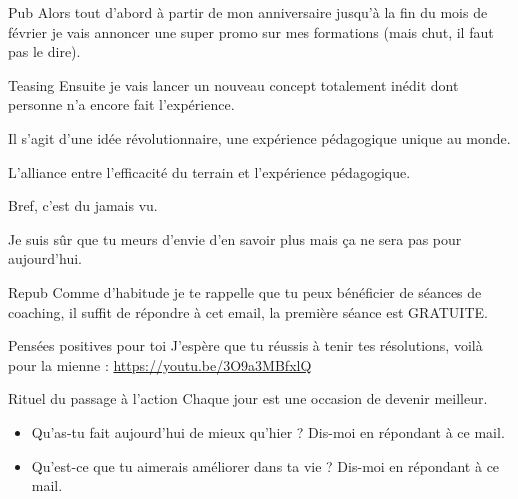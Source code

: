 \documentclass[presentation]{beamer}
\begin{document}
\begin{frame}[label={sec:orgd93b9af}]{Pub}
Alors tout d'abord à partir de mon anniversaire jusqu'à la fin du mois
de février je vais annoncer une super promo sur mes formations (mais
chut, il faut pas le dire).
\end{frame}



\begin{frame}[label={sec:orga6a6506}]{Teasing}
Ensuite je vais lancer un nouveau concept totalement inédit dont
personne n'a encore fait l'expérience.




Il s'agit d'une idée révolutionnaire, une expérience pédagogique
unique au monde.




L'alliance entre l'efficacité du terrain et l'expérience pédagogique.



Bref, c'est du jamais vu.



Je suis sûr que tu meurs d'envie d'en savoir plus mais ça ne sera pas
pour aujourd'hui.
\end{frame}



\begin{frame}[label={sec:org0ca27b7}]{Repub}
Comme d'habitude je te rappelle que tu peux bénéficier de séances de
coaching, il suffit de répondre à cet email, la première séance est
GRATUITE. 
\end{frame}



\begin{frame}[label={sec:orgbb7670a}]{Pensées positives pour toi}
J'espère que tu réussis à tenir tes résolutions, voilà pour la
mienne : \url{https://youtu.be/3O9a3MBfxlQ}
\end{frame}



\begin{frame}[label={sec:org86a9d31}]{Rituel du passage à l'action}
Chaque jour est une occasion de devenir meilleur.



\begin{itemize}
\item Qu'as-tu fait aujourd'hui de mieux qu'hier ? 
Dis-moi en répondant à ce mail.

\item Qu'est-ce que tu aimerais améliorer dans ta vie ? 
Dis-moi en répondant à ce mail.
\end{itemize}
\end{frame}
\end{document}
